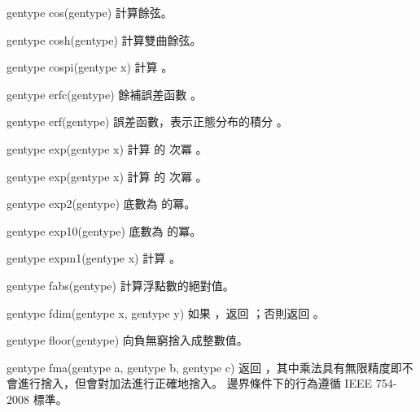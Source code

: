 gentype cos(gentype)
\stopbuffer
{}
計算餘弦。
\stopbuffer

gentype cosh(gentype)
\stopbuffer
{}
計算雙曲餘弦。
\stopbuffer

gentype cospi(gentype x)
\stopbuffer
{}
計算 。
\stopbuffer

gentype erfc(gentype)
\stopbuffer
{}
餘補誤差函數
 。
\stopbuffer

gentype erf(gentype)
\stopbuffer
{}
誤差函數，表示正態分布的積分
 。
\stopbuffer

gentype exp(gentype x)
\stopbuffer
{}
計算  的  次冪 。
\stopbuffer

gentype exp(gentype x)
\stopbuffer
{}
計算  的  次冪 。
\stopbuffer

gentype exp2(gentype)
\stopbuffer
{}
底數為  的冪。
\stopbuffer

gentype exp10(gentype)
\stopbuffer
{}
底數為  的冪。
\stopbuffer

gentype expm1(gentype x)
\stopbuffer
{}
計算 。
\stopbuffer

gentype fabs(gentype)
\stopbuffer
{}
計算浮點數的絕對值。
\stopbuffer

gentype fdim(gentype x,
	     gentype y)
\stopbuffer
{}
如果 ，返回 ；否則返回 。
\stopbuffer

gentype floor(gentype)
\stopbuffer
{}
向負無窮捨入成整數值。
\stopbuffer

gentype fma(gentype a,
	    gentype b,
	    gentype c)
\stopbuffer
{}
返回 ，其中乘法具有無限精度即不會進行捨入，但會對加法進行正確地捨入。
邊界條件下的行為遵循 IEEE 754-2008 標準。
\stopbuffer

